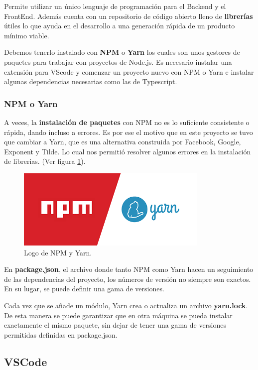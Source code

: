 \documentclass[12pt,twoside,titlepage]{report}
\begin{document}
Permite utilizar un único lenguaje de programación para el Backend y el FrontEnd. Además cuenta con un repositorio de código abierto lleno de \textbf{librerías} útiles lo que ayuda en el desarrollo a una generación rápida de un producto mínimo viable.

Debemos tenerlo instalado con \textbf{NPM} o \textbf{Yarn} los cuales son unos gestores de paquetes para trabajar con proyectos de Node.js. Es necesario instalar una extensión para VScode y comenzar un proyecto nuevo con NPM o Yarn e instalar algunas dependencias necesarias como las de Typescript.

\subsubsection{NPM o Yarn}

A veces, la \textbf{instalación de paquetes} con NPM no es lo suficiente consistente o rápida, dando incluso a errores. Es por ese el motivo que en este proyecto se tuvo que cambiar a Yarn, que es una alternativa construida por Facebook, Google, Exponent y Tilde. Lo cual nos permitió resolver algunos errores en la instalación de librerias.
(Ver figura \ref{fig:NPMYarnLogo}).

\begin{figure}[H]
    \centering
    \includegraphics[scale=0.4]{Nodejs/NPMvsYarn}
    \caption{Logo de NPM y Yarn.}
    \label{fig:NPMYarnLogo}
\end{figure}

En \textbf{package.json}, el archivo donde tanto NPM como Yarn hacen un seguimiento de las dependencias del proyecto, los números de versión no siempre son exactos. En su lugar, se puede definir una gama de versiones.

Cada vez que se añade un módulo, Yarn crea o actualiza un archivo \textbf{yarn.lock}.
De esta manera se puede garantizar que en otra máquina se pueda instalar exactamente el mismo paquete, sin dejar de tener una gama de versiones permitidas definidas en package.json. 


\subsection{VSCode}
\end{document}
